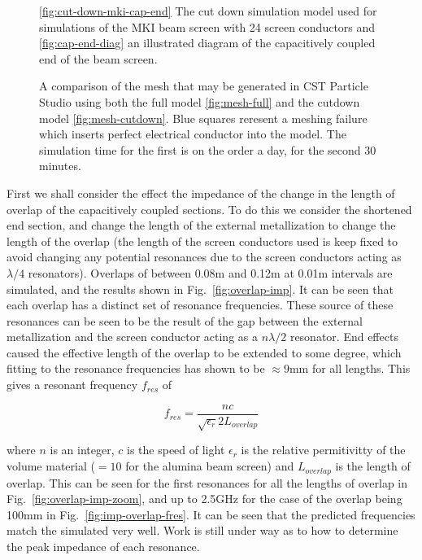 \begin{figure}
\subfigure[]{
\label{fig:cut-down-mki-cap-end}
}
\subfigure[]{
\label{fig:cap-end-diag}
}
\caption{\ref{fig:cut-down-mki-cap-end} The cut down simulation model used for simulations of the MKI beam screen with 24 screen conductors and \ref{fig:cap-end-diag} an illustrated diagram of the capacitively coupled end of the beam screen.}
\end{figure}

\begin{figure}
\subfigure[]{
\label{fig:mesh-full}
}
\subfigure[]{
\label{fig:mesh-cutdown}
}
\label{fig:mki-mesh-com-cst}
\caption{A comparison of the mesh that may be generated in CST Particle Studio using both the full model \ref{fig:mesh-full} and the cutdown model \ref{fig:mesh-cutdown}. Blue squares reresent a meshing failure which inserts perfect electrical conductor into the model. The simulation time for the first is on the order a day, for the second 30 minutes.}
\end{figure}

First we shall consider the effect the impedance of the change in the length of overlap of the capacitively coupled sections. To do this we consider the shortened end section, and change the length of the external metallization to change the length of the overlap (the length of the screen conductors used is keep fixed to avoid changing any potential resonances due to the screen conductors acting as $\lambda /4$ resonators). Overlaps of between 0.08m and 0.12m at 0.01m intervals are simulated, and the results shown in Fig.~\ref{fig:overlap-imp}. It can be seen that each overlap has a distinct set of resonance frequencies. These source of these resonances can be seen to be the result of the gap between the external metallization and the screen conductor acting as a $n \lambda /2$ resonator. End effects caused the effective length of the overlap to be extended to some degree, which fitting to the resonance frequencies has shown to be $\approx 9$mm for all lengths. This gives a resonant frequency $f_{res}$ of

\begin{equation}
f_{res} = \frac{nc}{\sqrt{\epsilon_{r}}2 L_{overlap}}
\label{fig:imp-overlap-fres}
\end{equation}

where $n$ is an integer, $c$ is the speed of light $\epsilon_{r}$ is the relative permitivitty of the volume material ($=10$ for the alumina beam screen) and $L_{overlap}$ is the length of overlap. This can be seen for the first resonances for all the lengths of overlap in Fig.~\ref{fig:overlap-imp-zoom}, and up to 2.5GHz for the case of the overlap being 100mm in Fig.~\ref{fig:imp-overlap-fres}. It can be seen that the predicted frequencies match the simulated very well. Work is still under way as to how to determine the peak impedance of each resonance.

